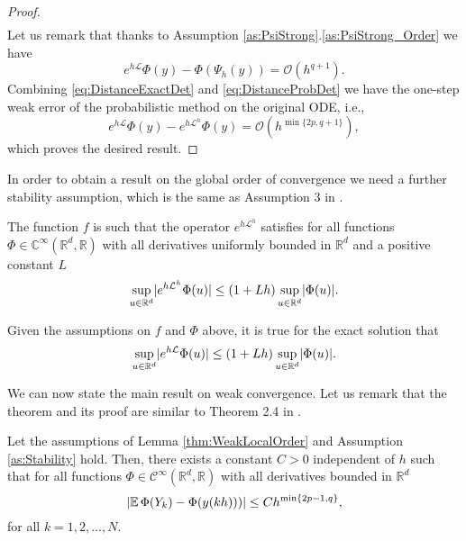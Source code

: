 \documentclass{siamart1116}
\numberwithin{theorem}{section}
\DeclarePairedDelimiter{\abs}{\lvert}{\rvert}
\newcommand{\R}{\mathbb{R}}
\newcommand{\C}{\mathbb{C}}
\newcommand{\OO}{\mathcal{O}}
\newcommand{\diffL}{\mathcal{L}}
\newcommand{\E}{\operatorname{\mathbb{E}}}
\begin{document}
\begin{proof}
\begin{equation}
\begin{aligned}
		\end{aligned}
	\end{equation}
	Let us remark that thanks to Assumption \ref{as:PsiStrong}.\ref{as:PsiStrong_Order} we have
	\begin{equation}\label{eq:DistanceExactDet}
		e^{h\diffL}\Phi(y) - \Phi(\Psi_h(y)) = \OO(h^{q+1}).
	\end{equation}
	Combining \eqref{eq:DistanceExactDet} and \eqref{eq:DistanceProbDet} we have the one-step weak error of the probabilistic method on the original ODE, i.e., 
	\begin{equation}\label{eq:LocalWeakError}
		e^{h\diffL}\Phi(y) - e^{h\diffL^h}\Phi(y) = \OO(h^{\min\{2p, q+1\}}),
	\end{equation}
	which proves the desired result.
\end{proof}

In order to obtain a result on the global order of convergence we need a further stability assumption, which is the same as Assumption 3 in \cite{CGS16}.

\begin{assumption}\label{as:Stability} The function $f$ is such that the operator $e^{h\diffL^h}$ satisfies for all functions $\Phi\in\C^{\infty}(\R^d, \R)$ with all derivatives uniformly bounded in $\R^d$ and a positive constant $L$
	\begin{equation}
		\sup_{u\in\R^d} \abs{e^{h\diffL^h}\Phi(u)} \leq (1 + Lh)\sup_{u\in\R^d}\abs{\Phi(u)}.
	\end{equation}
\end{assumption}
\begin{remark} Given the assumptions on $f$ and $\Phi$ above, it is true for the exact solution that
	\begin{equation}
		\sup_{u\in\R^d} \abs{e^{h\diffL}\Phi(u)} \leq (1 + Lh)\sup_{u\in\R^d}\abs{\Phi(u)}.
	\end{equation}
\end{remark}

We can now state the main result on weak convergence. Let us remark that the theorem and its proof are similar to Theorem 2.4 in \cite{CGS16}.

\begin{theorem}\label{thm:weakOrder} Let the assumptions of Lemma \ref{thm:WeakLocalOrder} and Assumption \ref{as:Stability} hold. Then, there exists a constant $C > 0$ independent of $h$ such that for all functions $\Phi \in \mathcal{C}^\infty(\R^d,\R)$ with all derivatives bounded in $\R^d$
	\begin{equation}
		\abs{\E\Phi(Y_k) - \Phi(y(kh)))} \leq Ch^{\min\{2p - 1, q\}},
	\end{equation}
	for all $k = 1, 2, \ldots, N$.
\end{theorem}
	
\end{document}
